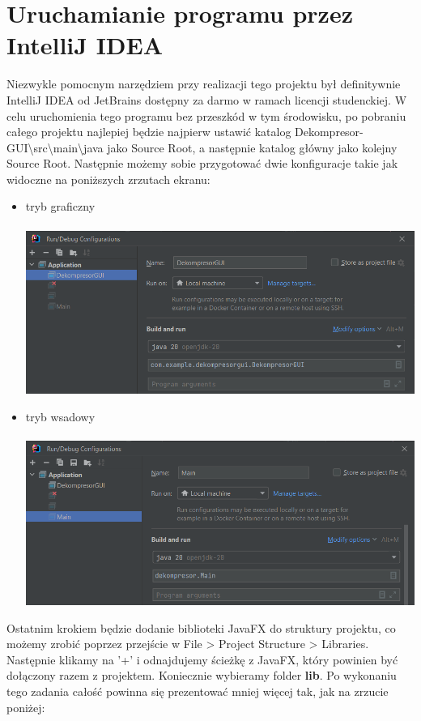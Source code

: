 \documentclass[]{article}
\begin{document}
\section{Uruchamianie programu przez IntelliJ IDEA}\label{header-n256}
Niezwykle pomocnym narzędziem przy realizacji tego projektu był definitywnie IntelliJ IDEA od JetBrains dostępny za darmo w ramach licencji studenckiej. W celu uruchomienia tego programu bez przeszkód w tym środowisku, po pobraniu całego projektu najlepiej będzie najpierw ustawić katalog Dekompresor-GUI\textbackslash src\textbackslash main\textbackslash java jako Source Root, a następnie katalog główny jako kolejny Source Root. Następnie możemy sobie przygotować dwie konfiguracje takie jak widoczne na poniższych zrzutach ekranu:
\begin{itemize}
\item
tryb graficzny\\\\
\includegraphics[width=\textwidth]{config1.png}
\newpage
\item
tryb wsadowy\\\\
\includegraphics[width=\textwidth]{config2.png}
\end{itemize}
Ostatnim krokiem będzie dodanie biblioteki JavaFX do struktury projektu, co możemy zrobić poprzez przejście w File > Project Structure > Libraries. Następnie klikamy na '+' i odnajdujemy ścieżkę z JavaFX, który powinien być dołączony razem z projektem. Koniecznie wybieramy folder \textbf{lib}. Po wykonaniu tego zadania całość powinna się prezentować mniej więcej tak, jak na zrzucie poniżej:\\
\end{document}
